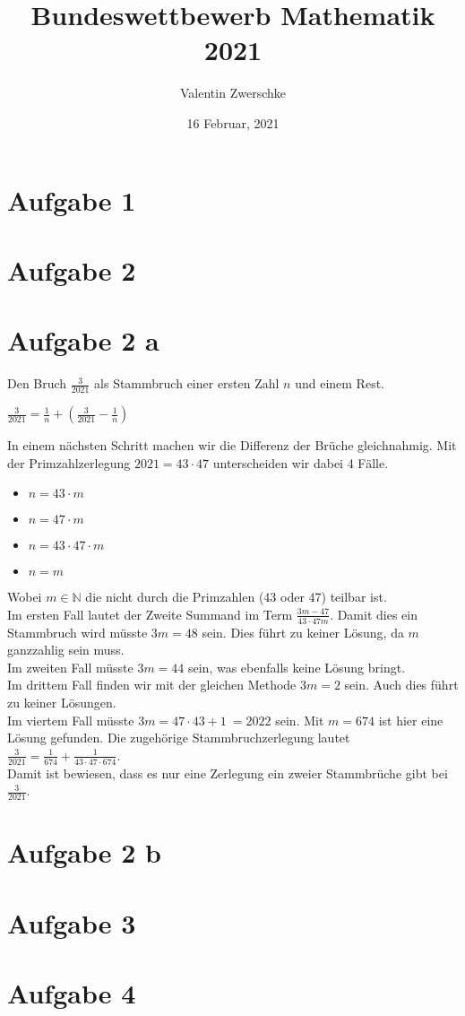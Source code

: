 \documentclass{article}
\title{Bundeswettbewerb Mathematik 2021}
\author{Valentin Zwerschke}
\date{16 Februar, 2021}
\begin{document}
\maketitle

\section*{Aufgabe 1}
\section*{Aufgabe 2}
\section*{Aufgabe 2 a}
Den Bruch $\frac{3}{2021}$ als Stammbruch einer ersten Zahl $n$ und einem Rest.
\begin{center}
    $\frac{3}{2021} = \frac{1}{n} + (\frac{3}{2021} - \frac{1}{n})$
\end{center}
In einem nächsten Schritt machen wir die Differenz der Brüche gleichnahmig. Mit der Primzahlzerlegung $2021 = 43 \cdot 47$ unterscheiden wir dabei 4 Fälle.
\begin{itemize}
    \item $n = 43 \cdot m$
    \item $n = 47 \cdot m$
    \item $n = 43 \cdot 47 \cdot m$
    \item $n = m$
\end{itemize}
Wobei \(m \in \mathbb{N}\) die nicht durch die Primzahlen (43 oder 47) teilbar ist.\\Im ersten Fall lautet der Zweite Summand im Term \(\frac{3m-47}{43 \cdot 47m}\). Damit dies ein Stammbruch wird müsste \(3m = 48\) sein. Dies führt zu keiner Lösung, da \(m\) ganzzahlig sein muss.\\Im zweiten Fall müsste \(3m = 44\) sein, was ebenfalls keine Lösung bringt.\\
Im drittem Fall finden wir mit der gleichen Methode \(3m = 2\) sein. Auch dies führt zu keiner Lösungen.\\
Im viertem Fall müsste \(3m = 47 \cdot 43 + 1\ = 2022\) sein. Mit \(m = 674\) ist hier eine Lösung gefunden. Die zugehörige Stammbruchzerlegung lautet \(\frac{3}{2021} = \frac{1}{674} + \frac{1}{43 \cdot 47 \cdot 674}\).\\
Damit ist bewiesen, dass es nur eine Zerlegung ein zweier Stammbrüche gibt bei \(\frac{3}{2021}\).

\section*{Aufgabe 2 b}
\section*{Aufgabe 3}
\section*{Aufgabe 4}
\end{document}
